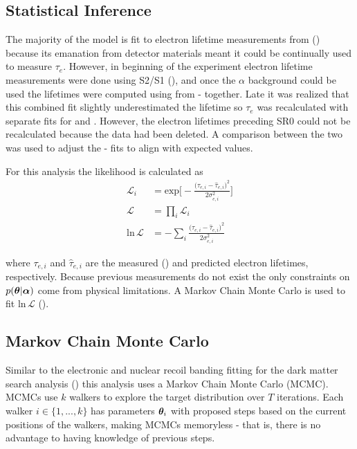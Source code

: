 \subsection{Statistical Inference}
\label{subsec:elifetime_fit_likelihood}
The majority of the model is fit to electron lifetime measurements from 
() because its emanation from
detector materials meant it could be continually used to measure $\tau_e$.  However, in beginning of the
experiment electron lifetime measurements were done using S2/S1 (), and once the $\alpha$
background could be used the lifetimes were computed using \alphadecays from - together.  Late it was realized
that this combined
fit slightly underestimated the lifetime so $\tau_e$ was recalculated with separate fits for  and .  However,
the electron lifetimes preceding SR0 could not be recalculated because the data had been deleted.  A comparison between the two was used
to adjust the - fits to align with expected values.

For this analysis the likelihood is calculated as
\vspace{-5pt}
\begin{subequations}
\begin{align}
\mathcal{L}_i &= \mathrm{exp} \Bigg[ -\frac{\big(\tau_{e, i} -
\hat{\tau}_{e, i} \big)^2}{2 \sigma_{e, i}^2} \Bigg]
\\[3pt]
\mathcal{L} &= \prod_i \mathcal{L}_i
\\[3pt]
\mathrm{ln}\, \mathcal{L} &= -\sum_i \frac{\big(\tau_{e, i} -
\hat{\tau}_{e, i} \big)^2}{2\sigma_{e, i}^2}
\end{align}
\label{eq:elifetime_fit_mcmc_de_snooker_projs}
\end{subequations}

\vspace{-25pt}

\noindent where $\tau_{e, i}$ and $\hat{\tau}_{e, i}$ are the measured () and predicted
electron lifetimes, respectively.  Because previous measurements do not exist the only constraints on $p(\boldsymbol{\theta}|\boldsymbol{\alpha})$
come from physical limitations.  A Markov Chain Monte Carlo is used to fit $\mathrm{ln}\, \mathcal{L}$
().



\subsection{Markov Chain Monte Carlo}
\label{subsec:elifetime_fit_mcmc}
Similar to the electronic and nuclear recoil banding fitting for the dark matter search analysis
() this analysis uses a Markov Chain Monte Carlo (MCMC).  MCMCs use $k$ walkers
to explore the target distribution
over $T$ iterations.  Each walker $i \in \{1, ..., k\}$ has parameters $\boldsymbol{\theta}_i$ with proposed steps based on the current
positions of the walkers, making MCMCs memoryless - that is, there is no advantage to having knowledge of previous steps.

